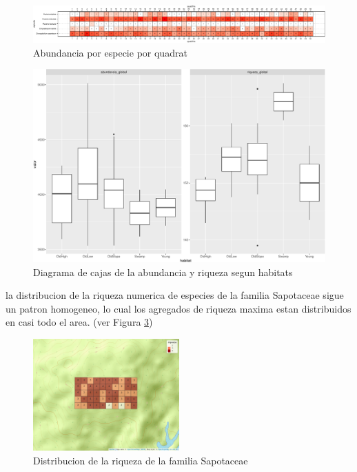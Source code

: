 \documentclass[11pt,]{article}
\begin{document}
\begin{figure}
\centering
\includegraphics{manuscrito_files/figure-latex/unnamed-chunk-3-1.pdf}
\caption{\label{fig:abun_sp_q}Abundancia por especie por quadrat}
\end{figure}

\begin{figure}
\centering
\includegraphics{manuscrito_files/figure-latex/unnamed-chunk-4-1.pdf}
\caption{\label{fig:P13}Diagrama de cajas de la abundancia y riqueza
segun habitats}
\end{figure}

la distribucion de la riqueza numerica de especies de la familia
Sapotaceae sigue un patron homogeneo, lo cual los agregados de riqueza
maxima estan distribuidos en casi todo el area. (ver Figura
\ref{fig:mapa_cuadros_riq_mi_familia})

\begin{figure}
\centering
\includegraphics[width=0.50000\textwidth]{mapa_cuadros_riq_mi_familia.png}
\caption{Distribucion de la riqueza de la familia
Sapotaceae\label{fig:mapa_cuadros_riq_mi_familia}}
\end{figure}
\end{document}
